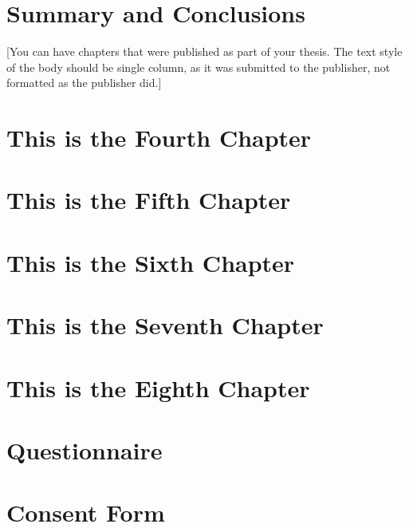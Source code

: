 \documentclass[12pt]{caltech_thesis}
\begin{document}
\chapter{Summary and Conclusions}



[You can have chapters that were published as part of your thesis. The text style of the body should be single column, as it was submitted to the publisher, not formatted as the publisher did.]

\chapter{This is the Fourth Chapter}
\chapter{This is the Fifth Chapter}
\chapter{This is the Sixth Chapter}
\chapter{This is the Seventh Chapter}
\chapter{This is the Eighth Chapter}

\printbibliography[heading=bibintoc]

 
\appendix

\chapter{Questionnaire}
\chapter{Consent Form}

\printindex

\theendnotes

\pocketmaterial
{} 
\end{document}
